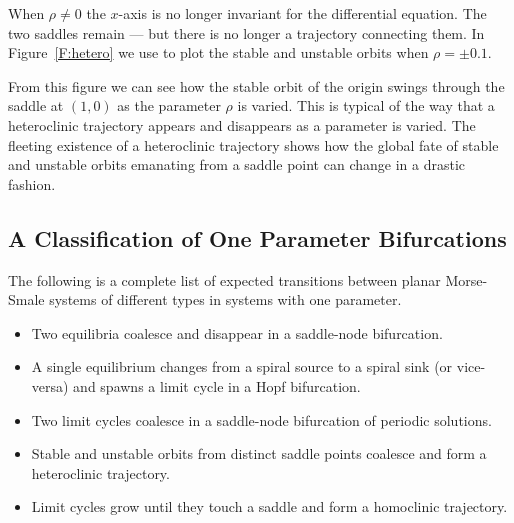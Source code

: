 \documentclass{ximera}
\begin{document}
When $\rho\neq 0$ the $x$-axis is no longer invariant for the differential 
equation.  The two saddles remain --- but there is no longer a 
trajectory connecting them.  In Figure~\ref{F:hetero} we use 
{\pplane} 
to plot the stable and unstable orbits when $\rho=\pm 0.1$.

From this figure we can see how the stable orbit of the origin swings 
through the saddle at $(1,0)$ as the parameter $\rho$ is varied.  This
is typical of the way that a heteroclinic trajectory appears and disappears 
as a parameter is varied.  The fleeting existence of a heteroclinic trajectory
shows how the global fate of stable and unstable orbits emanating from a 
saddle point can change in a drastic fashion. 


\subsection*{A Classification of One Parameter Bifurcations}

The following is a complete list of expected transitions between planar 
Morse-Smale systems of different types in systems with one parameter.
\begin{itemize}
\item	Two equilibria coalesce and disappear in a saddle-node bifurcation.
\item	A single equilibrium changes from a spiral source to a spiral sink (or 
vice-versa) and spawns a limit cycle in a Hopf bifurcation.
\item	Two limit cycles coalesce in a saddle-node bifurcation of 
periodic solutions.
\item	Stable and unstable orbits from distinct saddle points
coalesce and form a heteroclinic trajectory.
\item	Limit cycles grow until they touch a saddle and form a homoclinic 
trajectory.
\end{itemize}


\EXER

\CEXER
\end{document}
